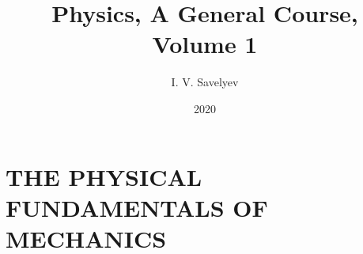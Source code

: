 \documentclass[11pt, twoside, fleqn]{book}
\title{Physics, A General Course, Volume 1}
\author{I. V. Savelyev}
\date{2020}
\numberwithin{equation}{chapter}
\begin{document}
\setlength{\abovedisplayskip}{3pt}
\setlength{\belowdisplayskip}{3pt}
\setlength{\abovedisplayshortskip}{3pt}
\setlength{\belowdisplayshortskip}{3pt}

\frontmatter


\cleardoublepage

\cleardoublepage

\cleardoublepage
{\hypersetup{linkcolor=black!80}
	\tableofcontents
}
\cleardoublepage

\mainmatter


\cleardoublepage

\part{THE PHYSICAL FUNDAMENTALS OF MECHANICS}\label{part:part_a}
\cleardoublepage

\cleardoublepage

\cleardoublepage

\cleardoublepage

\cleardoublepage

\cleardoublepage

\cleardoublepage

\cleardoublepage

\cleardoublepage


\cleardoublepage

\end{document}
